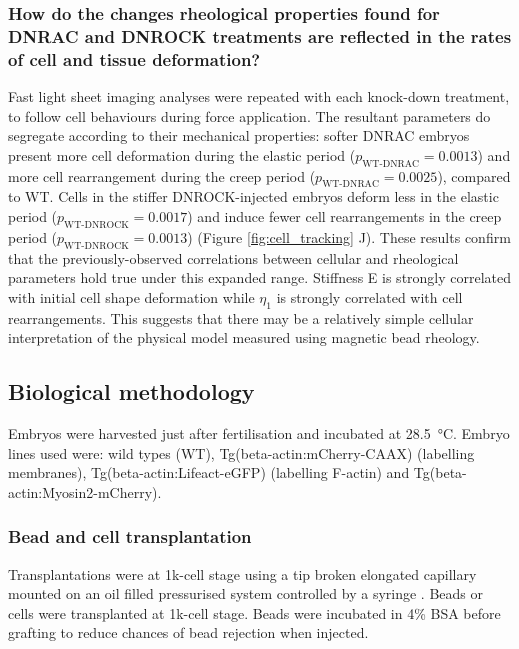 \subsubsection{How do the changes rheological properties found for DNRAC and DNROCK treatments are reflected in the rates of cell and tissue deformation?}

Fast light sheet imaging analyses were repeated with each knock-down treatment, to follow cell behaviours during force application.
The resultant parameters do segregate according to their mechanical properties: softer DNRAC embryos present more cell deformation during the elastic period ($p_\text{WT-DNRAC} = 0.0013$) and more cell rearrangement during the creep period ($p_\text{WT-DNRAC} = 0.0025$), compared to WT.
Cells in the stiffer DNROCK-injected embryos deform less in the elastic period ($p_\text{WT-DNROCK} = 0.0017$) and induce fewer cell rearrangements in the creep period ($p_\text{WT-DNROCK} = 0.0013$) (Figure \ref{fig:cell_tracking} J).
These results confirm that the previously-observed correlations between cellular and rheological parameters hold true under this expanded range.
Stiffness E is strongly correlated with initial cell shape deformation while $\eta_1$ is strongly correlated with cell rearrangements.
This suggests that there may be a relatively simple cellular interpretation of the physical model measured using magnetic bead rheology.

\subsection{Biological methodology}
Embryos were harvested just after fertilisation and incubated at \SI{28.5}{\celsius}.
Embryo lines used were: wild types (WT), Tg(beta-actin:mCherry-CAAX) (labelling membranes), Tg(beta-actin:Lifeact-eGFP) (labelling F-actin) and Tg(beta-actin:Myosin2-mCherry).

\subsubsection{Bead and cell transplantation}
Transplantations were at 1k-cell stage using a tip broken elongated capillary \cite{} mounted on an oil filled pressurised system controlled by a syringe \cite{}.
Beads or cells were transplanted at 1k-cell stage.
Beads were incubated in 4\% BSA before grafting to reduce chances of bead rejection when injected.


